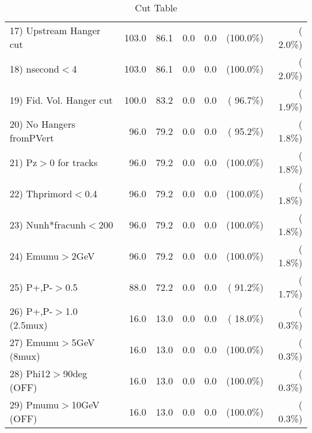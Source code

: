 \begin{table}[h!]
\begin{tabular}{||l||r|r|r|r|r|r||}
 17) Upstream Hanger cut  &        103.0 &         86.1 &          0.0 &          0.0 & (100.0\%) & (  2.0\%) \\
 18) nsecond$<$4          &        103.0 &         86.1 &          0.0 &          0.0 & (100.0\%) & (  2.0\%) \\
 19) Fid. Vol. Hanger cut &        100.0 &         83.2 &          0.0 &          0.0 & ( 96.7\%) & (  1.9\%) \\
 20) No Hangers fromPVert &         96.0 &         79.2 &          0.0 &          0.0 & ( 95.2\%) & (  1.8\%) \\
 21) Pz$>$0 for tracks    &         96.0 &         79.2 &          0.0 &          0.0 & (100.0\%) & (  1.8\%) \\
 22) Thprimord$<$0.4      &         96.0 &         79.2 &          0.0 &          0.0 & (100.0\%) & (  1.8\%) \\
 23) Nunh*fracunh$<$200   &         96.0 &         79.2 &          0.0 &          0.0 & (100.0\%) & (  1.8\%) \\
 24) Emumu$>$2GeV         &         96.0 &         79.2 &          0.0 &          0.0 & (100.0\%) & (  1.8\%) \\
 25) P+,P-$>$0.5          &         88.0 &         72.2 &          0.0 &          0.0 & ( 91.2\%) & (  1.7\%) \\
 26) P+,P-$>$1.0 (2.5mux) &         16.0 &         13.0 &          0.0 &          0.0 & ( 18.0\%) & (  0.3\%) \\
 27) Emumu$>$5GeV  (8mux) &         16.0 &         13.0 &          0.0 &          0.0 & (100.0\%) & (  0.3\%) \\
 28) Phi12$>$90deg  (OFF) &         16.0 &         13.0 &          0.0 &          0.0 & (100.0\%) & (  0.3\%) \\
 29) Pmumu$>$10GeV  (OFF) &         16.0 &         13.0 &          0.0 &          0.0 & (100.0\%) & (  0.3\%) \\
 \hline
 \hline
 \end{tabular}
 \caption{Cut Table           }
 \label{tab-cutcohjpsi-mumu_jpsi}
 \end{table}
